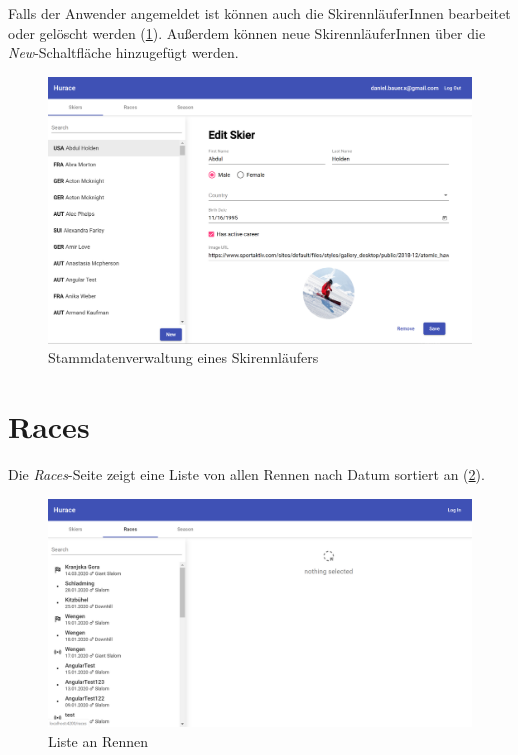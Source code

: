 Falls der Anwender angemeldet ist können auch die SkirennläuferInnen bearbeitet oder gelöscht werden (\cref{fig:skiers-form}).
Außerdem können neue SkirennläuferInnen über die \emph{New}-Schaltfläche hinzugefügt werden.
\begin{figure}[H]
    \centering
    \includegraphics[width=0.9\linewidth]{images/skiers-form}
    \caption{Stammdatenverwaltung eines Skirennläufers}
\label{fig:skiers-form}
\end{figure}

\section{Races}
Die \emph{Races}-Seite zeigt eine Liste von allen Rennen nach Datum sortiert an (\cref{fig:races-list}).
\begin{figure}[H]
    \centering
    \includegraphics[width=0.9\linewidth]{images/races-list}
    \caption{Liste an Rennen}
\label{fig:races-list}
\end{figure}


